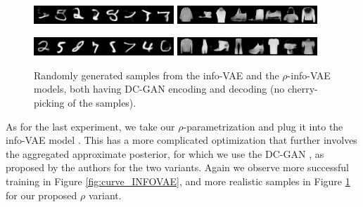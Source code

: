 \documentclass{article}
\begin{document}
 \begin{figure}  [!h]
   \begin{center} 
 {\includegraphics[width=0.47\textwidth]{figs/pics/generation_INFO_VAE_mnist.png}} 
 {\includegraphics[width=0.47\textwidth]{figs/pics/generation_INFO_VAE_fashion.png}} 

 {\includegraphics[width=0.47\textwidth]{figs/pics/generation_RHO_INFO_VAE_mnist.png}} 
 {\includegraphics[width=0.47\textwidth]{figs/pics/generation_RHO_INFO_VAE_fashion.png}} 

\end{center}
\vspace{-0.4cm}    
   \caption{Randomly generated samples from the info-VAE and the $\rho$-info-VAE models, both having DC-GAN encoding and decoding (no cherry-picking of the samples).}
   \label{fig:pic_INFOVAE}
   \end{figure}

As for the last experiment, we take our $\rho$-parametrization and plug it into the info-VAE model \cite{InfoVAE}. This has a more complicated optimization that further involves the aggregated approximate posterior, for which we use the DC-GAN \cite{radford2015unsupervised}, as proposed by the authors for the two variants. Again we observe more successful training in Figure \ref{fig:curve_INFOVAE}, and more realistic samples in Figure \ref{fig:pic_INFOVAE} for our proposed $\rho$ variant. 
\end{document}

